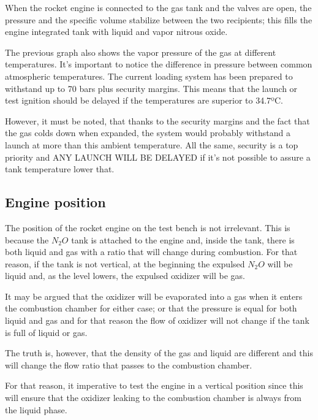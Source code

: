 When the rocket engine is connected to the gas tank and the valves are open, the pressure and the specific volume stabilize between the two recipients; this fills the engine integrated tank with liquid and vapor nitrous oxide.

The previous graph also shows the vapor pressure of the gas at different temperatures. It's important to notice the difference in pressure between common atmospheric temperatures. The current loading system has been prepared to withstand up to 70 bars plus security margins. This means that the launch or test ignition should be delayed if the temperatures are superior to 34.7ºC.

However, it must be noted, that thanks to the security margins and the fact that the gas colds down when expanded, the system would probably withstand a launch at more than this ambient temperature. All the same, security is a top priority and ANY LAUNCH WILL BE DELAYED if it's not possible to assure a tank temperature lower that.

\subsection*{Engine position}

The position of the rocket engine on the test bench is not irrelevant. This is because the $N_2O$ tank is attached to the engine and, inside the tank, there is both liquid and gas with a ratio that will change during combustion. For that reason, if the tank is not vertical, at the beginning the expulsed $N_2O$ will be liquid and, as the level lowers, the expulsed oxidizer will be gas.

It may be argued that the oxidizer will be evaporated into a gas when it enters the combustion chamber for either case; or that the pressure is equal for both liquid and gas and for that reason the flow of oxidizer will not change if the tank is full of liquid or gas.

The truth is, however, that the density of the gas and liquid are different and this will change the flow ratio that passes to the combustion chamber.

For that reason, it imperative to test the engine in a vertical position since this will ensure that the oxidizer leaking to the combustion chamber is always from the liquid phase.